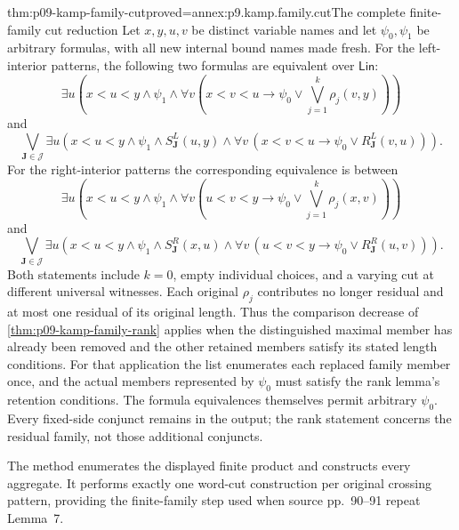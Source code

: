 \begin{hblemma}{thm:p09-kamp-family-cut}{proved=annex:p9.kamp.family.cut}{The complete finite-family cut reduction}
Let \(x,y,u,v\) be distinct variable names and let
\(\psi_0,\psi_1\) be arbitrary formulas, with all new
internal bound names made fresh. For the left-interior patterns,
the following two formulas are equivalent over \(\mathsf{Lin}\):
\[
 \exists u\left(x<u<y\land\psi_1\land
   \forall v\left(x<v<u\to\psi_0\lor\bigvee_{j=1}^k\rho_j(v,y)\right)\right)
\]
and
\[
 \bigvee_{\mathbf J\in\mathcal J}
 \exists u\left(x<u<y\land\psi_1\land S_{\mathbf J}^L(u,y)\land
       \forall v\,(x<v<u\to\psi_0\lor R_{\mathbf J}^L(v,u))\right).
\]
For the right-interior patterns the corresponding equivalence is
between
\[
 \exists u\left(x<u<y\land\psi_1\land
   \forall v\left(u<v<y\to\psi_0\lor\bigvee_{j=1}^k\rho_j(x,v)\right)\right)
\]
and
\[
 \bigvee_{\mathbf J\in\mathcal J}
 \exists u\left(x<u<y\land\psi_1\land S_{\mathbf J}^R(x,u)\land
       \forall v\,(u<v<y\to\psi_0\lor R_{\mathbf J}^R(u,v))\right).
\]
Both statements include \(k=0\), empty individual choices,
and a varying cut at different universal witnesses. Each original
\(\rho_j\) contributes no longer residual and at most one
residual of its original length. Thus the comparison decrease of
\cref{thm:p09-kamp-family-rank} applies when the distinguished
maximal member has already been removed and the other retained
members satisfy its stated length conditions. For that application the
list enumerates each replaced family member once, and the actual
members represented by \(\psi_0\) must satisfy the rank lemma's
retention conditions. The formula equivalences themselves permit
arbitrary \(\psi_0\). Every fixed-side
conjunct remains in the output; the rank statement concerns the
residual family, not those additional conjuncts.

The method enumerates the displayed finite product and constructs
every aggregate. It performs exactly one word-cut construction per
original crossing pattern, providing the finite-family step used
when source pp.~90--91 repeat Lemma~7.
\end{hblemma}

